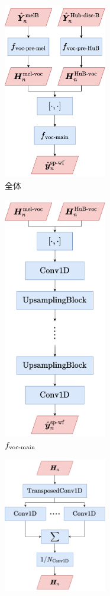 \begin{figure}[tb]
    \centering
    \begin{subfigure}[b]{0.32\textwidth}
        \centering
        \includegraphics[width=45mm]{./figure/sec4/model_2/vocoder.drawio.png}
        \caption{全体}
        \label{sec4:fig:vocoder_overview}
    \end{subfigure}
    \hfill
    \begin{subfigure}[b]{0.32\textwidth}
        \centering
        \includegraphics[width=45mm]{./figure/sec4/model_2/vocoder_main.drawio.png}
        \caption{$f_{\text{voc-main}}$}
        \label{sec4:fig:vocoder_main}
    \end{subfigure}
    \hfill
    \begin{subfigure}[b]{0.32\textwidth}
        \centering
        \includegraphics[width=45mm]{./figure/sec4/model_2/vocoder_main_block.drawio.png}

\end{subfigure}
\end{figure}
